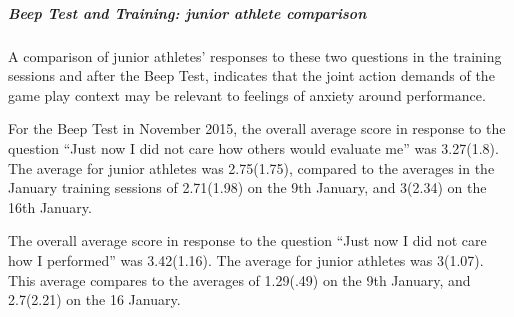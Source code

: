 \begin{CJK}{UTF8}{gbsn}
\subparagraph{Beep Test and Training: junior athlete comparison}
A comparison of junior athletes' responses to these two questions in the training sessions and after the Beep Test, indicates that the joint action demands of the game play context may be relevant to feelings of anxiety around performance.

For the Beep Test in November 2015, the overall average score in response to the question ``Just now I did not care how others would evaluate me'' was 3.27(1.8).  The average for junior athletes was 2.75(1.75), compared to the averages in the January training sessions of 2.71(1.98) on the 9th January, and 3(2.34) on the 16th January.

The overall average score in response to the question ``Just now I did not care how I performed'' was 3.42(1.16).  The average for junior athletes was 3(1.07).  This average compares to the averages of 1.29(.49) on the 9th January, and 2.7(2.21) on the 16 January.









\end{CJK}
